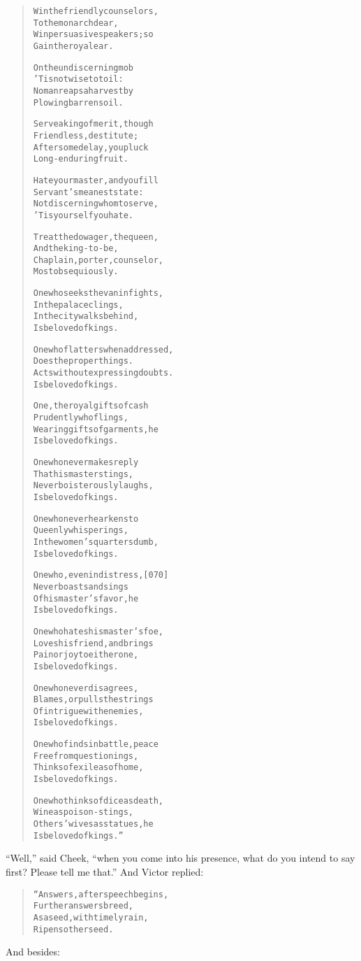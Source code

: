 \documentclass[article, twoside, 14pt]{memoir}
\renewenvironment{verbatim}{%
\begin{quote}%
\vskip -10pt%
\begin{alltt}\normalfont\large}{\end{alltt}%
\end{quote}%
\vskip -10pt
} %
\begin{document}
\begin{verbatim}
Win the friendly counselors,
    To the monarch dear,
Win persuasive speakers; so
    Gain the royal ear.

On the undiscerning mob
    'Tis not wise to toil:
No man reaps a harvest by
    Plowing barren soil.

Serve a king of merit, though
    Friendless, destitute;
After some delay, you pluck
    Long-enduring fruit.

Hate your master, and you fill
    Servant's meanest state:
Not discerning whom to serve,
    'Tis yourself you hate.

Treat the dowager, the queen,
    And the king-to-be,
Chaplain, porter, counselor,
    Most obsequiously.

One who seeks the van in fights,
    In the palace clings,
In the city walks behind,
    Is beloved of kings.

One who flatters when addressed,
    Does the proper things.
Acts without expressing doubts.
    Is beloved of kings.

One, the royal gifts of cash
    Prudently who flings,
Wearing gifts of garments, he
    Is beloved of kings.

One who never makes reply
    That his master stings,
Never boisterously laughs,
    Is beloved of kings.

One who never hearkens to
    Queenly whisperings,
In the women's quarters dumb,
    Is beloved of kings.

One who, even in distress,                              [070]
    Never boasts and sings
Of his master's favor, he
    Is beloved of kings.

One who hates his master's foe,
    Loves his friend, and brings
Pain or joy to either one,
    Is beloved of kings.

One who never disagrees,
    Blames, or pulls the strings
Of intrigue with enemies,
    Is beloved of kings.

One who finds in battle, peace
    Free from questionings,
Thinks of exile as of home,
    Is beloved of kings.

One who thinks of dice as death,
    Wine as poison-stings,
Others' wives as statues, he
    Is beloved of kings.”
\end{verbatim}
``Well,'' said Cheek,
``when you come into his presence, what do you intend to say first? Please tell me that.''
And Victor replied:

\begin{verbatim}
“Answers, after speech begins,
    Further answers breed,
As a seed, with timely rain,
    Ripens other seed.
\end{verbatim}
And besides:
\end{document}
